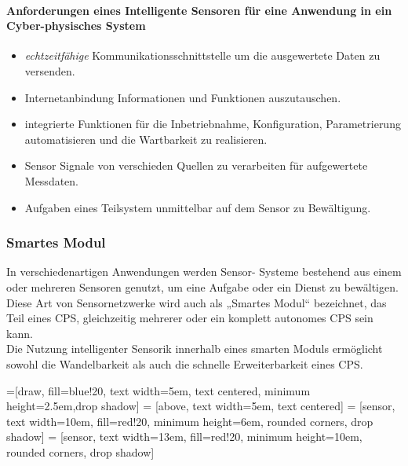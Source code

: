 \documentclass[a4paper,12pt]{scrartcl}
\begin{document}
\paragraph{Anforderungen eines Intelligente Sensoren für eine Anwendung in ein Cyber-physisches System \cite{[2] Seite 14 ff}}
\singlespacing
\begin{itemize}
\item \textit{echtzeitfähige} Kommunikationsschnittstelle um die ausgewertete Daten zu versenden.
\item Internetanbindung Informationen und Funktionen auszutauschen.
\item integrierte Funktionen für die Inbetriebnahme, Konfiguration, Parametrierung
automatisieren und die Wartbarkeit zu realisieren.
\item Sensor Signale von verschieden Quellen zu verarbeiten für
aufgewertete Messdaten.
\item Aufgaben eines Teilsystem unmittelbar auf dem Sensor zu Bewältigung.
\end{itemize}

\onehalfspacing
\subsubsection{Smartes Modul}
In verschiedenartigen Anwendungen werden Sensor-
Systeme bestehend aus einem oder mehreren Sensoren genutzt, um eine Aufgabe oder ein Dienst zu bewältigen. Diese Art von Sensornetzwerke wird auch als
„Smartes Modul“ bezeichnet, das Teil eines CPS, gleichzeitig mehrerer oder ein komplett autonomes CPS
sein kann.\\
Die Nutzung intelligenter Sensorik innerhalb eines smarten
Moduls ermöglicht sowohl die Wandelbarkeit als auch die schnelle Erweiterbarkeit eines CPS. \cite{[2] Seite 15 ff}


\vspace{0.5cm}


=[draw, fill=blue!20, text width=5em, 
    text centered, minimum height=2.5em,drop shadow]
 = [above, text width=5em, text centered]
 = [sensor, text width=10em, fill=red!20, 
    minimum height=6em, rounded corners, drop shadow]
 = [sensor, text width=13em, fill=red!20, 
    minimum height=10em, rounded corners, drop shadow]
\end{document}
